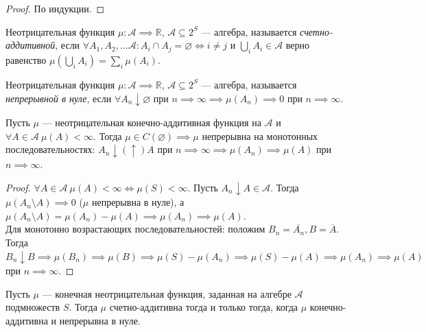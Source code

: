         \begin{proof}
            По индукции.
        \end{proof}
        \begin{definition}\label{lect02:def1}
             Неотрицательная функция $\mu: \mathcal{A} \implies \mathbb{R}$, $\mathcal{A} \subseteq 2^S$ --- алгебра, называется \emph{счетно-аддитивной}, если $\forall A_1, A_2, \dots \mathcal{A}: A_i \cap A_j = \varnothing \iff i \neq j$ и $\bigcup\limits_i A_i \in \mathcal{A}$ верно равенство $\mu(\bigcup\limits_i A_i) = \sum\limits_i \mu(A_i)$.
        \end{definition}
        \begin{definition}\label{lect02:def2}
             Неотрицательная функция $\mu: \mathcal{A} \implies \mathbb{R}$, $\mathcal{A} \subseteq 2^S$ --- алгебра, называется \emph{непрерывной в нуле}, если $\forall A_n \downarrow \varnothing$ при $n \implies \infty \implies \mu(A_n) \implies 0$ при $n \implies \infty$.
        \end{definition}
        \begin{lemma}\label{lect02:lemma1}
            Пусть $\mu$ --- неотрицательная конечно-аддитивная функция на $\mathcal{A}$ и $\forall A \in \mathcal{A} \ \mu(A) < \infty$. Тогда $\mu \in C(\varnothing) \implies \mu$ непрерывна на монотонных последовательностях: $A_n \downarrow (\uparrow) A$ при $n \implies \infty \implies \mu(A_n) \implies \mu(A)$ при $n \implies \infty$.
        \end{lemma}
        \begin{proof}
            $\forall A \in \mathcal{A} \ \mu(A) < \infty \iff \mu(S) < \infty$. Пусть $A_n \downarrow A \in \mathcal{A}$. Тогда $\mu(A_n \setminus A) \implies 0$ ($\mu$ непрерывна в нуле), а $\mu(A_n \setminus A) = \mu(A_n) - \mu(A) \implies \mu(A_n) \implies \mu(A)$.\\
            Для монотонно возрастающих последовательностей: положим $B_n = \overline{A_n}, B = \overline{A}$. Тогда $B_n \downarrow B \implies \mu(B_n) \implies \mu(B) \implies \mu(S) - \mu(A_n) \implies \mu(S) - \mu(A) \implies \mu(A_n) \implies \mu(A)$ при $n \implies \infty$.
        \end{proof}
        \begin{theorem}\label{lect02:th3}
            Пусть $\mu$ --- конечная неотрицательная функция, заданная на алгебре $\mathcal{A}$ подмножеств $S$. Тогда $\mu$ счетно-аддитивна тогда и только тогда, когда $\mu$ конечно-аддитивна и непрерывна в нуле.
        \end{theorem}
